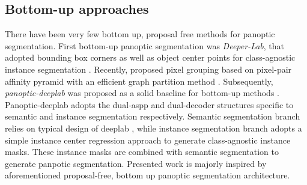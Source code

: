 \subsection{Bottom-up approaches}

There have been very few bottom up, proposal free methods for panoptic segmentation. First bottom-up panoptic segmentation was \textit{Deeper-Lab}, that adopted bounding box corners as well as object center points for class-agnostic instance segmentation \cite{DBLPDeeperLab:journals/corr/abs-1902-05093}. Recently, \cite{Gao2019} proposed pixel grouping based on pixel-pair affinity pyramid \cite{Liu2018} with an efficient graph partition method \cite{Keuper2015}. Subsequently, \textit{panoptic-deeplab} was proposed as a solid baseline for bottom-up methods \cite{Cheng_2020_CVPR}. Panoptic-deeplab adopts the dual-\Gls{aspp} and dual-decoder structures specific to semantic and instance segmentation respectively. Semantic segmentation branch relies on typical design of deeplab \cite{Chen2018}, while instance segmentation branch adopts a simple instance center regression approach to generate class-agnostic instance masks. These instance masks are combined with semantic segmentation to generate panpotic segmentation. Presented work is majorly inspired by aforementioned proposal-free, bottom up panoptic segmentation architecture.  